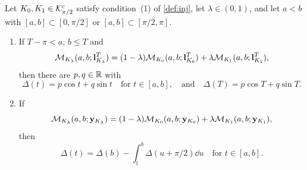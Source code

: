 \begin{lemma}\label{lem:tangent}
Let $K_0,K_1\in\mathcal{K}^{\mathrm{c}}_{\pi/2}$ satisfy condition~(1) of \cref{def:inj}, let
$\lambda\in(0,1)$, and let $a<b$ with $[a,b]\subset[0,\pi/2]$ or
$[a,b]\subset[\pi/2,\pi]$.
\begin{enumerate}[label=(\alph*)]
\item\label{lem:tangent:l} If $T-\pi<a$, $b\le T$ and
\[
  \mathcal{M}_{K_\lambda}(a,b;\mathbf l_{K_\lambda}^T)
  =(1-\lambda)\mathcal{M}_{K_0}(a,b;\mathbf l_{K_0}^T)
  +\lambda\mathcal{M}_{K_1}(a,b;\mathbf l_{K_1}^T),
\]
then there are $p,q\in\mathbb{R}$ with
\[
  \Delta(t)=p\cos t+q\sin t\quad\text{for }t\in[a,b],\quad\text{and}\quad
  \Delta(T)=p\cos T+q\sin T.
\]
\item\label{lem:tangent:y} If
\[
  \mathcal{M}_{K_\lambda}(a,b;\mathbf{y}_{K_\lambda})
  =(1-\lambda)\mathcal{M}_{K_0}(a,b;\mathbf{y}_{K_0})+\lambda\mathcal{M}_{K_1}(a,b;\mathbf{y}_{K_1}),
\]
then
\[
  \Delta(t)=\Delta(b)-\int_t^b\Delta(u+\pi/2)\dd u\quad\text{for }t\in[a,b].
\]
\end{enumerate}
\end{lemma}

